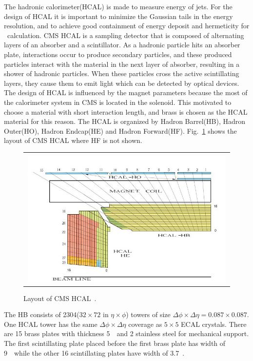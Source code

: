 The hadronic calorimeter(HCAL) is made to measure energy of jets.
For the design of HCAL it is important to minimize the Gaussian tails in the energy 
resolution, and to achieve good containment of energy deposit and 
hermeticity for \met\ calculation. CMS HCAL is a sampling detector 
that is composed of alternating layers of an absorber and a scintillator. 
As a hadronic particle hits an absorber plate, interactions occur to produce 
secondary particles, and these produced particles interact with 
the material in the next layer of absorber, resulting in a shower of 
hadronic particles. When these particles cross the active scintillating  
layers, they cause them to emit light which can be detected by 
optical devices. 
The design of HCAL is influenced by the magnet parameters because 
the most of the calorimeter system in CMS is located in the solenoid.
This motivated to choose a material with short interaction length,
and brass is chosen as the HCAL material for this reason. 
The HCAL is organized by Hadron Barrel(HB), Hadron Outer(HO), Hadron Endcap(HE) 
and Hadron Forward(HF).  
Fig.~\ref{fig:hcal_layout} shows the layout of CMS HCAL where HF is not shown. 
%
\begin{figure}[h] 
\vspace{1cm}
\centering 
\begin{tabular}{|c|} 
\hline
\\
\includegraphics[width=0.99\textwidth]{figures/Hcal-segementation-updated.JPG}\\
\hline
\end{tabular} 
\caption{Layout of CMS HCAL~\cite{Chatrchyan:2009hw}.}
\label{fig:hcal_layout} 
\end{figure} 

The HB consists of 2304($32 \times 72$ in $\eta \times \phi$) towers of size 
$\Delta \phi \times \Delta \eta = 0.087 \times 0.087$. One HCAL tower 
has the same $\Delta \phi \times \Delta \eta$ coverage as $5\times5$
ECAL crystals. There are 15 brass plates with thickness 5~\cm\ and 
2 stainless steel for mechanical support. The first scintillating 
plate placed before the first brass plate has width of 9~\mm\ while 
the other 16 scintillating plates have width of 3.7~\mm. 

